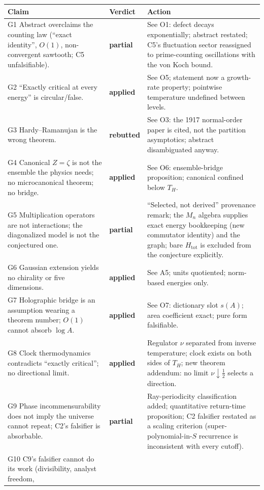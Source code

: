 \documentclass[11pt,a4paper]{article}
\newcommand{\ok}{\textbf{applied}}
\newcommand{\reb}{\textbf{rebutted}}
\newcommand{\pver}{\textbf{partial}}
\begin{document}
\begin{longtable}{@{}p{}p{}p{}@{}}
\toprule
\textbf{Claim} & \textbf{Verdict} & \textbf{Action}\\
\midrule
\endhead
G1 Abstract overclaims the counting law (``exact identity'', $O(1)$,
non-convergent sawtooth; C5 unfalsifiable). & \pver & See O1: defect decays
exponentially; abstract restated; C5's fluctuation sector reassigned to
prime-counting oscillations with the von Koch bound.\\
G2 ``Exactly critical at every energy'' is circular/false. & \ok & See O5;
statement now a growth-rate property; pointwise temperature undefined between
levels.\\
G3 Hardy--Ramanujan is the wrong theorem. & \reb & See O3: the 1917
normal-order paper is cited, not the partition asymptotics; abstract
disambiguated anyway.\\
G4 Canonical $Z=\zeta$ is not the ensemble the physics needs; no
microcanonical theorem; no bridge. & \ok & See O6: ensemble-bridge
proposition; canonical confined below $T_H$.\\
G5 Multiplication operators are not interactions; the diagonalized model is
not the conjectured one. & \pver & ``Selected, not derived'' provenance remark;
the $M_n$ algebra supplies exact energy bookkeeping (new commutator identity)
and the graph; bare $H_{\mathrm{tot}}$ is excluded from the conjecture
explicitly.\\
G6 Gaussian extension yields no chirality or five dimensions. & \ok & See A5;
units quotiented; norm-based energies only.\\
G7 Holographic bridge is an assumption wearing a theorem number; $O(1)$
cannot absorb $\log A$. & \ok & See O7: dictionary slot $s(A)$; area
coefficient exact; pure form falsifiable.\\
G8 Clock thermodynamics contradicts ``exactly critical''; no directional
limit. & \ok & Regulator $\nu$ separated from inverse temperature; clock
exists on both sides of $T_H$; new theorem addendum: no limit
$\nu\downarrow\frac12$ selects a direction.\\
G9 Phase incommensurability does not imply the universe cannot repeat; C2's
falsifier is absorbable. & \pver & Ray-periodicity classification added;
quantitative return-time proposition; C2 falsifier restated as a scaling
criterion (super-polynomial-in-$S$ recurrence is inconsistent with every
cutoff).\\
G10 C9's falsifier cannot do its work (divisibility, analyst freedom,

\end{longtable}
\end{document}
